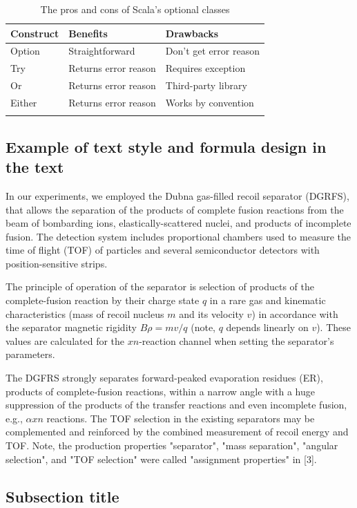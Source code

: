 \documentclass[12pt,a4paper,twoside]{article}
\begin{document}
\begin{longtable}[]{@{}lll@{}}
\hline
Construct & Benefits & Drawbacks\tabularnewline
\hline
\endhead
Option & Straightforward & Don't get error reason\tabularnewline
Try & Returns error reason & Requires exception\tabularnewline
Or & Returns error reason & Third-party library\tabularnewline
Either & Returns error reason & Works by convention\tabularnewline
\hline
\caption{The pros and cons of Scala's optional classes}
\label{table:prosConsOptionalApproaches}
\end{longtable}

\subsection*{Example of text style and formula design in the text}


In our experiments, we employed the Dubna gas-filled recoil separator (DGRFS), that allows the separation of the products of complete fusion reactions from the beam of bombarding ions, elastically-scattered nuclei, and products of incomplete fusion. The detection system includes proportional chambers used to measure the time of flight (TOF) of particles and several semiconductor detectors with position-sensitive strips. 

The principle of operation of the separator is selection of products of the complete-fusion reaction by their charge state $q$ in a rare gas and kinematic characteristics (mass of recoil nucleus $m$ and its velocity $v$) in accordance with the separator magnetic rigidity $B\rho=mv/q$ (note, $q$ depends linearly on $v$). These values are calculated for the $xn$-reaction channel when setting the separator's parameters. 

The DGFRS strongly separates forward-peaked evaporation residues (ER), products of complete-fusion reactions, within a narrow angle with a huge suppression of the products of the transfer reactions and even incomplete fusion, e.g., $\alpha xn$ reactions. The TOF selection in the existing separators may be complemented and reinforced by the combined measurement of recoil energy and TOF. Note, the production properties "separator", "mass separation", "angular selection", and "TOF selection" were called "assignment properties" in [3].

\subsection*{Subsection title}
\end{document}

